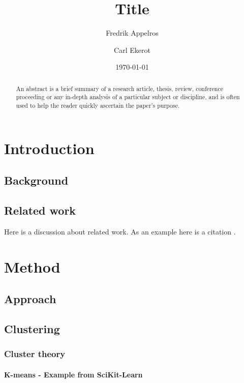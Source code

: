 \documentclass[a4paper]{report}
\begin{document}
\title{Title}
\author{Fredrik Appelros \and Carl Ekerot}
\date{\today}
\maketitle

\begin{abstract}
An abstract is a brief summary of a research article, thesis, review,
conference proceeding or any in-depth analysis of a particular subject or
discipline, and is often used to help the reader quickly ascertain the paper's
purpose.
\end{abstract}

\tableofcontents

\chapter{Introduction}

\section{Background}

\section{Related work}
Here is a discussion about related work. As an example here is a citation
\cite{cui07}.

\chapter{Method}

\section{Approach}

\section{Clustering}

\subsection{Cluster theory}

\subsubsection{K-means - Example from SciKit-Learn}
\end{document}
